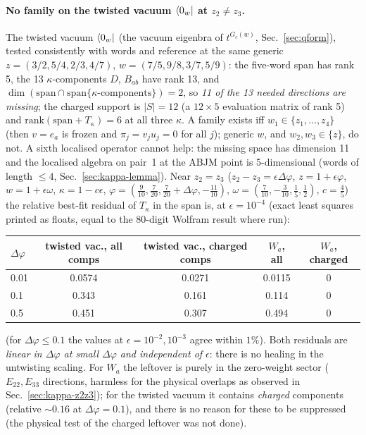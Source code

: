\paragraph{No family on the twisted vacuum $\langle0_w|$ at $z_2\ne z_3$.} The twisted vacuum $\langle0_w|$ (the vacuum eigenbra of $t^{G_c(w)}$, Sec.~\ref{sec:qform}), tested consistently with words and reference at the same generic $z=(3/2,5/4,2/3,4/7)$, $w=(7/5,9/8,3/7,5/9)$:
the five-word span has rank 5, the 13 $\kappa$-components $D$, $B_{ab}$ have rank 13, and $\dim(\mathrm{span}\cap\mathrm{span}\{\kappa\text{-components}\})=2$, so \emph{11 of the 13 needed directions are missing}; the charged support is $|S|=12$ (a $12\times5$ evaluation matrix of rank 5) and $\mathrm{rank}(\mathrm{span}+T_\kappa)=6$ at all three $\kappa$.
A family exists iff $w_1\in\{z_1,\dots,z_4\}$ (then $v=e_a$ is frozen and $\pi_j=v_ju_j=0$ for all $j$); generic $w$, and $w_2,w_3\in\{z\}$, do not. A sixth localised operator cannot help: the missing space has dimension 11 and the localised algebra on pair~1 at the ABJM point is 5-dimensional (words of length $\le4$, Sec.~\ref{sec:kappa-lemma}).
Near $z_2=z_3$ ($z_2-z_3=\epsilon\Delta\varphi$, $z=1+\epsilon\varphi$, $w=1+\epsilon\omega$, $\kappa=1-c\epsilon$, $\varphi=(\tfrac9{10},\tfrac7{20},\tfrac7{20}+\Delta\varphi,-\tfrac{11}{10})$, $\omega=(\tfrac7{10},-\tfrac3{10},\tfrac15,\tfrac12)$, $c=\tfrac45$) the relative best-fit residual of $T_\kappa$ in the span is, at $\epsilon=10^{-4}$ (exact least squares printed as floats, equal to the 80-digit Wolfram result where run):
\begin{center}
\begin{tabular}{lcccc}
\toprule
$\Delta\varphi$ & twisted vac., all comps & twisted vac., charged comps & $W_a$, all & $W_a$, charged\\
\midrule
0.01 & 0.0574 & 0.0271 & 0.0115 & 0\\
0.1 & 0.343 & 0.161 & 0.114 & 0\\
0.5 & 0.451 & 0.307 & 0.494 & 0\\
\bottomrule
\end{tabular}
\end{center}
(for $\Delta\varphi\le0.1$ the values at $\epsilon=10^{-2},10^{-3}$ agree within $1\%$). Both residuals are \emph{linear in $\Delta\varphi$ at small $\Delta\varphi$ and independent of $\epsilon$}: there is no healing in the untwisting scaling. For $W_a$ the leftover is purely in the zero-weight sector ($E_{22},E_{33}$ directions, harmless for the physical overlaps as observed in Sec.~\ref{sec:kappa-z2z3}); for the twisted vacuum it contains \emph{charged} components (relative $\sim0.16$ at $\Delta\varphi=0.1$), and there is no reason for these to be suppressed (the physical test of the charged leftover was not done).
